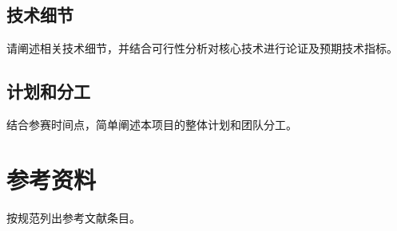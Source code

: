 \documentclass{cpipc}
\begin{document}
{\SubsectionHeading\subsection{技术细节}}
{\BodyText
请阐述相关技术细节，并结合可行性分析对核心技术进行论证及预期技术指标。
}

{\SubsectionHeading\subsection{计划和分工}}
{\BodyText
结合参赛时间点，简单阐述本项目的整体计划和团队分工。
}

{\SectionHeading\section{参考资料}}
{\BodyText
按规范列出参考文献条目。
}
\end{document}
